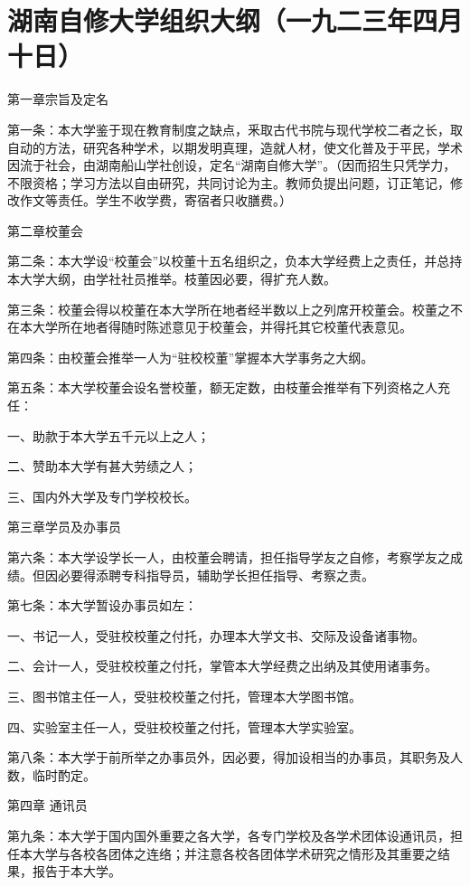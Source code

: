 \section{湖南自修大学组织大纲（一九二三年四月十日）}


第一章宗旨及定名

第一条：本大学鉴于现在教育制度之缺点，釆取古代书院与现代学校二者之长，取自动的方法，研究各种学术，以期发明真理，造就人材，使文化普及于平民，学术因流于社会，由湖南船山学社创设，定名“湖南自修大学”。（因而招生只凭学力，不限资格；学习方法以自由研究，共同讨论为主。教师负提出问题，订正笔记，修改作文等责任。学生不收学费，寄宿者只收膳费。）

第二章校董会

第二条：本大学设“校董会”以校董十五名组织之，负本大学经费上之责任，并总持本大学大纲，由学社社员推举。枝董因必要，得扩充人数。

第三条：校董会得以校董在本大学所在地者经半数以上之列席开校董会。校董之不在本大学所在地者得随时陈述意见于校董会，并得托其它校董代表意见。

第四条：由校董会推举一人为“驻校校董”掌握本大学事务之大纲。

第五条：本大学校董会设名誉校董，额无定数，由枝董会推举有下列资格之人充任：

一、助款于本大学五千元以上之人；

二、赞助本大学有甚大劳绩之人；

三、国内外大学及专门学校校长。

第三章学员及办事员

第六条：本大学设学长一人，由校董会聘请，担任指导学友之自修，考察学友之成绩。但因必要得添聘专科指导员，辅助学长担任指导、考察之责。

第七条：本大学暂设办事员如左：

一、书记一人，受驻校校董之付托，办理本大学文书、交际及设备诸事物。

二、会计一人，受驻校校董之付托，掌管本大学经费之出纳及其使用诸事务。

三、图书馆主任一人，受驻校校董之付托，管理本大学图书馆。

四、实验室主任一人，受驻校校董之付托，管理本大学实验室。

第八条：本大学于前所举之办事员外，因必要，得加设相当的办事员，其职务及人数，临时酌定。

第四章 通讯员

第九条：本大学于国内国外重要之各大学，各专门学校及各学术团体设通讯员，担任本大学与各校各团体之连络；并注意各校各团体学术研究之情形及其重要之结果，报告于本大学。

